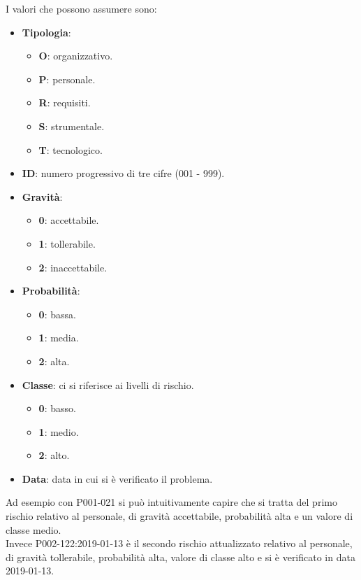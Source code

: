 			I valori che possono assumere sono:

			\begin{itemize}
				\item \textbf{Tipologia}:
				\begin{itemize}
					\item \textbf{O}: organizzativo.
					\item \textbf{P}: personale.
					\item \textbf{R}: requisiti.
					\item \textbf{S}: strumentale.
					\item \textbf{T}: tecnologico.
				\end{itemize}
				\item \textbf{ID}: numero progressivo di tre cifre (001 - 999).
				\item \textbf{Gravità}:
				\begin{itemize}
					\item \textbf{0}: accettabile.
					\item \textbf{1}: tollerabile.
					\item \textbf{2}: inaccettabile.
				\end{itemize}

				\item \textbf{Probabilità}:
				\begin{itemize}
					\item \textbf{0}: bassa.
					\item \textbf{1}: media.
					\item \textbf{2}: alta.
				\end{itemize}

				\item \textbf{Classe}: ci si riferisce ai livelli di rischio.
				\begin{itemize}
					\item \textbf{0}: basso.
					\item \textbf{1}: medio.
					\item \textbf{2}: alto.
				\end{itemize}

				\item \textbf{Data}: data in cui si è verificato il problema.
			\end{itemize}

			Ad esempio con P001-021 si può intuitivamente capire che si tratta del primo rischio relativo al personale, di gravità accettabile,
			probabilità alta e un valore di classe medio.\\
			Invece P002-122:2019-01-13 è il secondo rischio attualizzato relativo al personale, di gravità tollerabile, probabilità alta, valore di classe alto e si è verificato in data 2019-01-13.

